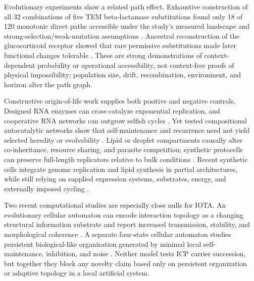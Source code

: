 Evolutionary experiments show a related path effect.  Exhaustive construction
of all 32 combinations of five TEM beta-lactamase substitutions found only 18
of 120 monotonic direct paths accessible under the study's measured landscape
and strong-selection/weak-mutation assumptions
\citep{WeinreichEtAl2006MutationalPaths}.  Ancestral reconstruction of the
glucocorticoid receptor showed that rare permissive substitutions made later
functional changes tolerable \citep{HarmsThornton2014Contingency}.  These are
strong demonstrations of context-dependent probability or operational
accessibility, not context-free proofs of physical impossibility; population
size, drift, recombination, environment, and horizon alter the path graph.

Constructive origin-of-life work supplies both positive and negative controls.
Designed RNA enzymes can cross-catalyze exponential replication, and cooperative
RNA networks can outgrow selfish cycles
\citep{LincolnJoyce2009RNAReplication,VaidyaEtAl2012CooperativeRNA}.  Yet tested compositional
autocatalytic networks show that self-maintenance and recurrence need not yield
selected heredity or evolvability \citep{VasasEtAl2010Evolvability}.  Lipid or
droplet compartments causally alter co-inheritance, resource sharing, and
parasite competition; synthetic protocells can preserve full-length replicators
relative to bulk conditions \citep{AbilEtAl2024ProtocellEvolution}.  Recent synthetic
cells integrate genome replication and lipid synthesis in partial
architectures, while still relying on supplied expression systems, substrates,
energy, and externally imposed cycling \citep{RestrepoSierraEtAl2026SyntheticCell}.

Two recent computational studies are especially close nulls for IOTA. An
evolutionary cellular automaton can encode interaction topology as a changing
structural information substrate and report increased transmission, stability,
and morphological coherence \citep{Chen2026TopologyCode}. A separate four-state
cellular automaton studies persistent biological-like organization generated by
minimal local self-maintenance, inhibition, and noise
\citep{Chen2026MinimalInteraction}. Neither model tests ICP carrier succession,
but together they block any novelty claim based only on persistent organization
or adaptive topology in a local artificial system.

